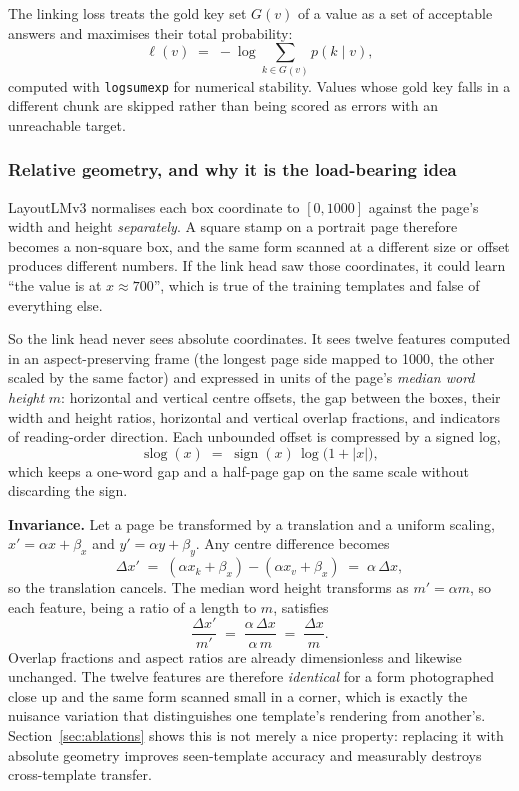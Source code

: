 \documentclass[11pt,a4paper]{article}
\newcommand{\code}[1]{\texttt{\small #1}}
\begin{document}
The linking loss treats the gold key set $G(v)$ of a value as a set of acceptable answers and
maximises their total probability:
\[
  \ell(v) \;=\; -\log \sum_{k \in G(v)} p(k \mid v),
\]
computed with \code{logsumexp} for numerical stability. Values whose gold key falls in a
different chunk are skipped rather than being scored as errors with an unreachable target.

\subsubsection{Relative geometry, and why it is the load-bearing idea}
\label{sec:geom}

LayoutLMv3 normalises each box coordinate to $[0,1000]$ against the page's width and height
\emph{separately}. A square stamp on a portrait page therefore becomes a non-square box, and the
same form scanned at a different size or offset produces different numbers. If the link head saw
those coordinates, it could learn ``the value is at $x \approx 700$'', which is true of the
training templates and false of everything else.

So the link head never sees absolute coordinates. It sees twelve features computed in an
aspect-preserving frame (the longest page side mapped to 1000, the other scaled by the same
factor) and expressed in units of the page's \emph{median word height} $m$: horizontal and
vertical centre offsets, the gap between the boxes, their width and height ratios, horizontal and
vertical overlap fractions, and indicators of reading-order direction. Each unbounded offset is
compressed by a signed log,
\[
  \operatorname{slog}(x) \;=\; \operatorname{sign}(x)\,\log\big(1 + |x|\big),
\]
which keeps a one-word gap and a half-page gap on the same scale without discarding the sign.

\textbf{Invariance.} Let a page be transformed by a translation and a uniform scaling,
$x' = \alpha x + \beta_x$ and $y' = \alpha y + \beta_y$. Any centre difference becomes
\[
  \Delta x' \;=\; (\alpha x_k + \beta_x) - (\alpha x_v + \beta_x) \;=\; \alpha\,\Delta x ,
\]
so the translation cancels. The median word height transforms as $m' = \alpha m$, so each feature,
being a ratio of a length to $m$, satisfies
\[
  \frac{\Delta x'}{m'} \;=\; \frac{\alpha\, \Delta x}{\alpha\, m} \;=\; \frac{\Delta x}{m} .
\]
Overlap fractions and aspect ratios are already dimensionless and likewise unchanged. The twelve
features are therefore \emph{identical} for a form photographed close up and the same form scanned
small in a corner, which is exactly the nuisance variation that distinguishes one template's
rendering from another's. Section~\ref{sec:ablations} shows this is not merely a nice property:
replacing it with absolute geometry improves seen-template accuracy and measurably destroys
cross-template transfer.
\end{document}
